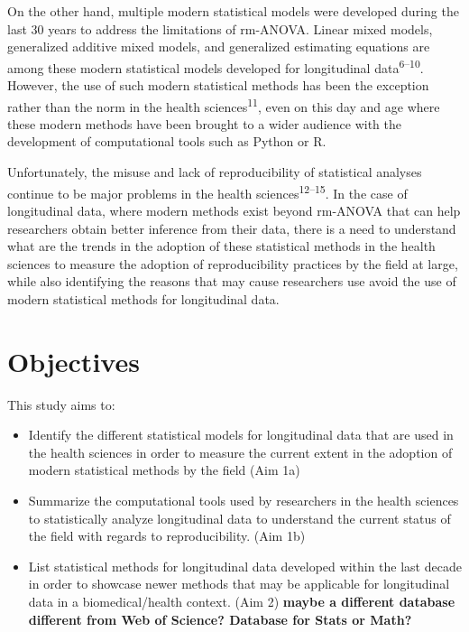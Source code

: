 \documentclass[
]{article}
\begin{document}
On the other hand, multiple modern statistical models were developed
during the last 30 years to address the limitations of rm-ANOVA. Linear
mixed models, generalized additive mixed models, and generalized
estimating equations are among these modern statistical models developed
for longitudinal data\textsuperscript{6--10}. However, the use of such
modern statistical methods has been the exception rather than the norm
in the health sciences\textsuperscript{11}, even on this day and age
where these modern methods have been brought to a wider audience with
the development of computational tools such as Python or R.

Unfortunately, the misuse and lack of reproducibility of statistical
analyses continue to be major problems in the health
sciences\textsuperscript{12--15}. In the case of longitudinal data,
where modern methods exist beyond rm-ANOVA that can help researchers
obtain better inference from their data, there is a need to understand
what are the trends in the adoption of these statistical methods in the
health sciences to measure the adoption of reproducibility practices by
the field at large, while also identifying the reasons that may cause
researchers use avoid the use of modern statistical methods for
longitudinal data.

\hypertarget{objectives}{%
\section{Objectives}\label{objectives}}

This study aims to:

\begin{itemize}
\item
  Identify the different statistical models for longitudinal data that
  are used in the health sciences in order to measure the current extent
  in the adoption of modern statistical methods by the field (Aim 1a)
\item
  Summarize the computational tools used by researchers in the health
  sciences to statistically analyze longitudinal data to understand the
  current status of the field with regards to reproducibility. (Aim 1b)
\item
  List statistical methods for longitudinal data developed within the
  last decade in order to showcase newer methods that may be applicable
  for longitudinal data in a biomedical/health context. (Aim 2)
  \textbf{maybe a different database different from Web of Science?
  Database for Stats or Math?}
\end{itemize}
\end{document}
